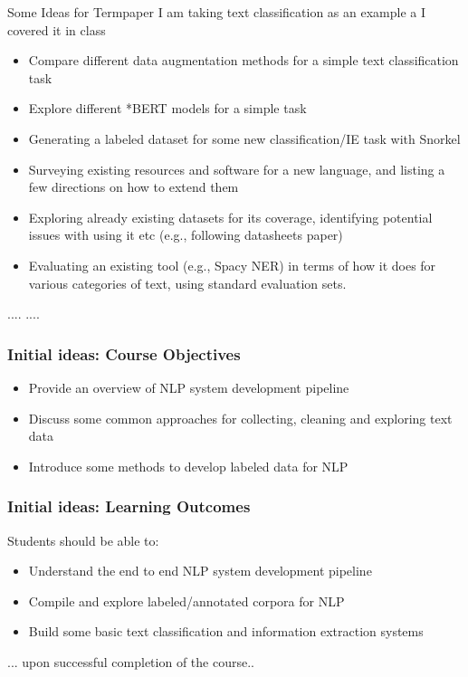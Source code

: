 \documentclass{beamer}
\begin{document}
\begin{frame}{Some Ideas for Termpaper}
I am taking text classification as an example a I covered it in class 
    \begin{itemize}
        \item Compare different data augmentation methods for a simple text classification task
        \item Explore different *BERT models for a simple task
        \item Generating a labeled dataset for some new classification/IE task with Snorkel
        \item Surveying existing resources and software for a new language, and listing a few directions on how to extend them
        \item Exploring already existing datasets for its coverage, identifying potential issues with using it etc (e.g., following datasheets paper)
        \item Evaluating an existing tool (e.g., Spacy NER) in terms of how it does for various categories of text, using standard evaluation sets. 
    \end{itemize}
    .... .... 
\end{frame}

\begin{frame}
\frametitle{Initial ideas: Course Objectives}
\begin{itemize}
\item Provide an overview of NLP system development pipeline
\item Discuss some common approaches for collecting, cleaning and exploring text data
\item Introduce some methods to develop labeled data for NLP 
\end{itemize}
\end{frame}

\begin{frame}
\frametitle{Initial ideas: Learning Outcomes}
Students should be able to: 
\begin{itemize}
\item Understand the end to end NLP system development pipeline
\item Compile and explore labeled/annotated corpora for NLP
\item Build some basic text classification and information extraction systems
\end{itemize}
... upon successful completion of the course..
\end{frame}
\end{document}
